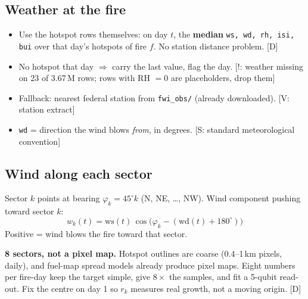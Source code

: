 \documentclass[11pt,a4paper]{article}
\newcommand{\tagbox}[2]{{\footnotesize\color{#1}\textsf{[#2]}}}
\newcommand{\supp}[1]{\tagbox{ForestGreen!70!black}{S: #1}}  %
\newcommand{\veri}[1]{\tagbox{ForestGreen!70!black}{V: #1}}  %
\newcommand{\ours}{\tagbox{NavyBlue}{D}}                      %
\newcommand{\caut}[1]{\tagbox{BrickRed}{!: #1}}               %
\newcommand{\code}[1]{\texttt{\small #1}}
\begin{document}
\subsection{Weather at the fire}
\begin{itemize}
\item Use the hotspot rows themselves: on day $t$, the \textbf{median} \code{ws, wd, rh, isi, bui} over that day's
  hotspots of fire $f$. No station distance problem. \ours
\item No hotspot that day $\Rightarrow$ carry the last value, flag the day.
  \caut{weather missing on 23 of 3.67\,M rows; rows with RH $=0$ are placeholders, drop them}
\item Fallback: nearest federal station from \code{fwi\_obs/} (already downloaded). \veri{station extract}
\item \code{wd} = direction the wind blows \emph{from}, in degrees. \supp{standard meteorological convention}
\end{itemize}

\subsection{Wind along each sector}
Sector $k$ points at bearing $\varphi_k=45^\circ k$ (N, NE, \dots, NW). Wind component pushing toward sector $k$:
\[
w_k(t)=\mathrm{ws}(t)\,\cos\!\big(\varphi_k-(\mathrm{wd}(t)+180^\circ)\big)
\]
Positive = wind blows the fire toward that sector.

\begin{decision}
\textbf{8 sectors, not a pixel map.} Hotspot outlines are coarse (0.4--1\,km pixels, daily), and fuel-map spread
models already produce pixel maps. Eight numbers per fire-day keep the target simple, give $8\times$ the samples, and fit
a 5-qubit read-out. Fix the centre on day 1 so $r_k$ measures real growth, not a moving origin. \ours
\end{decision}
\end{document}
